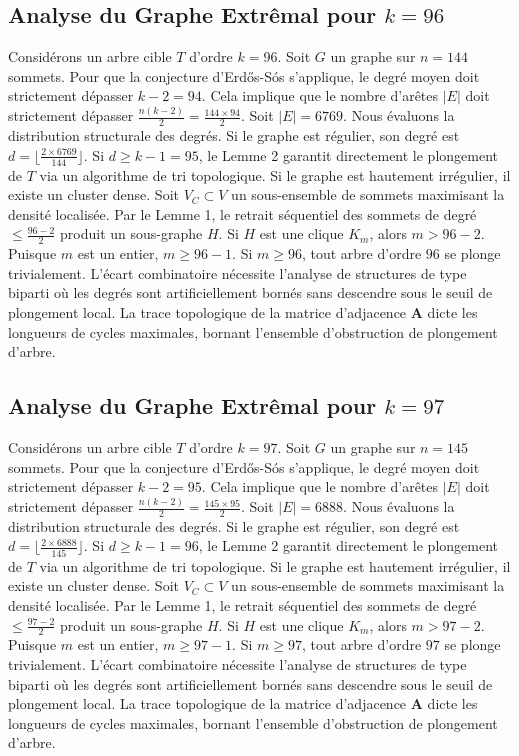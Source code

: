 \documentclass[11pt,a4paper]{article}
\begin{document}
\subsection{Analyse du Graphe Extr\^emal pour $k=96$}
Consid\'erons un arbre cible $T$ d'ordre $k=96$.
Soit $G$ un graphe sur $n=144$ sommets.
Pour que la conjecture d'Erd\H{o}s-S\'os s'applique, le degr\'e moyen doit strictement d\'epasser $k-2 = 94$.
Cela implique que le nombre d'ar\^etes $|E|$ doit strictement d\'epasser $\frac{n(k-2)}{2} = \frac{144 \times 94}{2}$.
Soit $|E| = 6769$.
Nous \'evaluons la distribution structurale des degr\'es. Si le graphe est r\'egulier, son degr\'e est $d = \lfloor \frac{2 \times 6769}{144} \rfloor$.
Si $d \geq k-1 = 95$, le Lemme 2 garantit directement le plongement de $T$ via un algorithme de tri topologique.
Si le graphe est hautement irr\'egulier, il existe un cluster dense. Soit $V_C \subset V$ un sous-ensemble de sommets maximisant la densit\'e localis\'ee.
Par le Lemme 1, le retrait s\'equentiel des sommets de degr\'e $\leq \frac{96-2}{2}$ produit un sous-graphe $H$.
Si $H$ est une clique $K_{m}$, alors $m > 96-2$. Puisque $m$ est un entier, $m \geq 96-1$. Si $m \geq 96$, tout arbre d'ordre $96$ se plonge trivialement.
L'\'ecart combinatoire n\'ecessite l'analyse de structures de type biparti o\`u les degr\'es sont artificiellement born\'es sans descendre sous le seuil de plongement local. La trace topologique de la matrice d'adjacence $\mathbf{A}$ dicte les longueurs de cycles maximales, bornant l'ensemble d'obstruction de plongement d'arbre.


\subsection{Analyse du Graphe Extr\^emal pour $k=97$}
Consid\'erons un arbre cible $T$ d'ordre $k=97$.
Soit $G$ un graphe sur $n=145$ sommets.
Pour que la conjecture d'Erd\H{o}s-S\'os s'applique, le degr\'e moyen doit strictement d\'epasser $k-2 = 95$.
Cela implique que le nombre d'ar\^etes $|E|$ doit strictement d\'epasser $\frac{n(k-2)}{2} = \frac{145 \times 95}{2}$.
Soit $|E| = 6888$.
Nous \'evaluons la distribution structurale des degr\'es. Si le graphe est r\'egulier, son degr\'e est $d = \lfloor \frac{2 \times 6888}{145} \rfloor$.
Si $d \geq k-1 = 96$, le Lemme 2 garantit directement le plongement de $T$ via un algorithme de tri topologique.
Si le graphe est hautement irr\'egulier, il existe un cluster dense. Soit $V_C \subset V$ un sous-ensemble de sommets maximisant la densit\'e localis\'ee.
Par le Lemme 1, le retrait s\'equentiel des sommets de degr\'e $\leq \frac{97-2}{2}$ produit un sous-graphe $H$.
Si $H$ est une clique $K_{m}$, alors $m > 97-2$. Puisque $m$ est un entier, $m \geq 97-1$. Si $m \geq 97$, tout arbre d'ordre $97$ se plonge trivialement.
L'\'ecart combinatoire n\'ecessite l'analyse de structures de type biparti o\`u les degr\'es sont artificiellement born\'es sans descendre sous le seuil de plongement local. La trace topologique de la matrice d'adjacence $\mathbf{A}$ dicte les longueurs de cycles maximales, bornant l'ensemble d'obstruction de plongement d'arbre.
\end{document}
